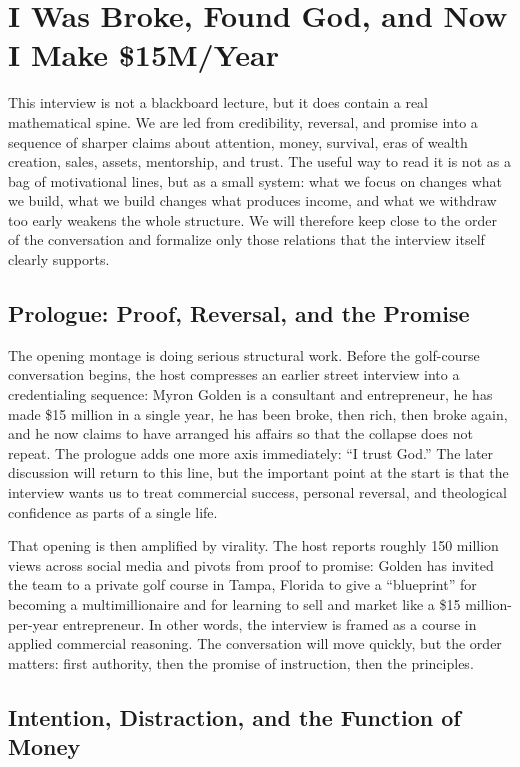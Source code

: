 \chapter{I Was Broke, Found God, and Now I Make \$15M/Year}

This interview is not a blackboard lecture, but it does contain a real mathematical spine. We are led from credibility, reversal, and promise into a sequence of sharper claims about attention, money, survival, eras of wealth creation, sales, assets, mentorship, and trust. The useful way to read it is not as a bag of motivational lines, but as a small system: what we focus on changes what we build, what we build changes what produces income, and what we withdraw too early weakens the whole structure. We will therefore keep close to the order of the conversation and formalize only those relations that the interview itself clearly supports.

\section{Prologue: Proof, Reversal, and the Promise}

The opening montage is doing serious structural work. Before the golf-course conversation begins, the host compresses an earlier street interview into a credentialing sequence: Myron Golden is a consultant and entrepreneur, he has made \$15 million in a single year, he has been broke, then rich, then broke again, and he now claims to have arranged his affairs so that the collapse does not repeat. The prologue adds one more axis immediately: ``I trust God.'' The later discussion will return to this line, but the important point at the start is that the interview wants us to treat commercial success, personal reversal, and theological confidence as parts of a single life.

That opening is then amplified by virality. The host reports roughly 150 million views across social media and pivots from proof to promise: Golden has invited the team to a private golf course in Tampa, Florida to give a ``blueprint'' for becoming a multimillionaire and for learning to sell and market like a \$15 million-per-year entrepreneur. In other words, the interview is framed as a course in applied commercial reasoning. The conversation will move quickly, but the order matters: first authority, then the promise of instruction, then the principles.

\section{Intention, Distraction, and the Function of Money}


